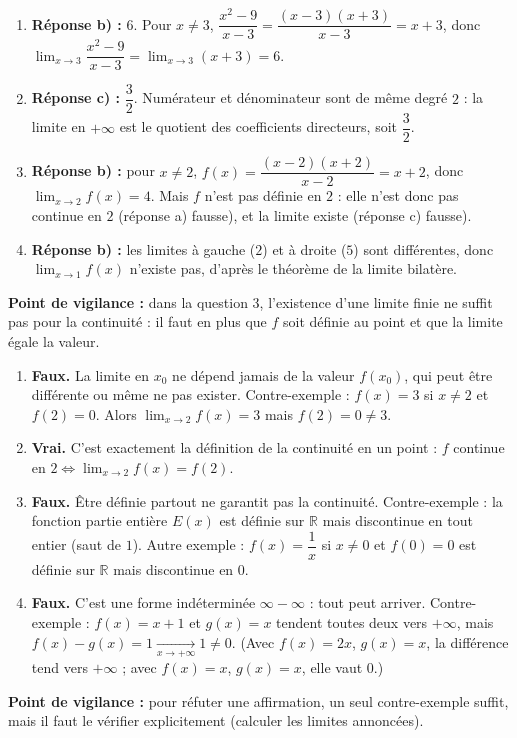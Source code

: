 \documentclass[11pt]{article}
\begin{document}
\begin{corrige}
\begin{enumerate}
\item \textbf{Réponse b) :} $6$. Pour $x\neq 3$, $\dfrac{x^2-9}{x-3}=\dfrac{(x-3)(x+3)}{x-3}=x+3$, donc $\lim_{x\to 3}\dfrac{x^2-9}{x-3}=\lim_{x\to 3}(x+3)=6$.
\item \textbf{Réponse c) :} $\dfrac{3}{2}$. Numérateur et dénominateur sont de même degré $2$ : la limite en $+\infty$ est le quotient des coefficients directeurs, soit $\dfrac{3}{2}$.
\item \textbf{Réponse b) :} pour $x\neq 2$, $f(x)=\dfrac{(x-2)(x+2)}{x-2}=x+2$, donc $\lim_{x\to 2}f(x)=4$. Mais $f$ n'est pas définie en $2$ : elle n'est donc pas continue en $2$ (réponse a) fausse), et la limite existe (réponse c) fausse).
\item \textbf{Réponse b) :} les limites à gauche ($2$) et à droite ($5$) sont différentes, donc $\lim_{x\to 1}f(x)$ n'existe pas, d'après le théorème de la limite bilatère.
\end{enumerate}
\textbf{Point de vigilance :} dans la question 3, l'existence d'une limite finie ne suffit pas pour la continuité : il faut en plus que $f$ soit définie au point et que la limite égale la valeur.
\end{corrige}

\begin{corrige}
\begin{enumerate}
\item \textbf{Faux.} La limite en $x_0$ ne dépend jamais de la valeur $f(x_0)$, qui peut être différente ou même ne pas exister. Contre-exemple : $f(x)=3$ si $x\neq 2$ et $f(2)=0$. Alors $\lim_{x\to 2}f(x)=3$ mais $f(2)=0\neq 3$.
\item \textbf{Vrai.} C'est exactement la définition de la continuité en un point : $f$ continue en $2 \iff \lim_{x\to 2}f(x)=f(2)$.
\item \textbf{Faux.} Être définie partout ne garantit pas la continuité. Contre-exemple : la fonction partie entière $E(x)$ est définie sur $\mathbb{R}$ mais discontinue en tout entier (saut de $1$). Autre exemple : $f(x)=\dfrac{1}{x}$ si $x\neq 0$ et $f(0)=0$ est définie sur $\mathbb{R}$ mais discontinue en $0$.
\item \textbf{Faux.} C'est une forme indéterminée $\infty-\infty$ : tout peut arriver. Contre-exemple : $f(x)=x+1$ et $g(x)=x$ tendent toutes deux vers $+\infty$, mais $f(x)-g(x)=1\xrightarrow[x\to+\infty]{}1\neq 0$. (Avec $f(x)=2x$, $g(x)=x$, la différence tend vers $+\infty$ ; avec $f(x)=x$, $g(x)=x$, elle vaut $0$.)
\end{enumerate}
\textbf{Point de vigilance :} pour réfuter une affirmation, un seul contre-exemple suffit, mais il faut le vérifier explicitement (calculer les limites annoncées).
\end{corrige}
\end{document}
